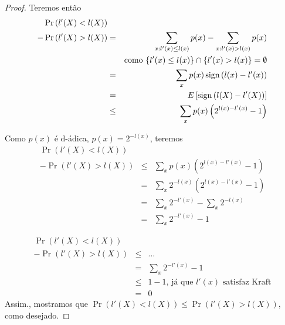 \begin{frame}[allowframebreaks]
\begin{proof}
   \proofbreak

   Teremos então
   \vspace{-0.35cm}
   \begin{eqnarray}
   \Pr \left( l'(X) < l(X) \right) && \nonumber \\
   - \Pr \left( l'(X) > l(X) \right) &=& \sum_{x:l'(x) \leq l(x)} p(x) - \sum_{x:l'(x)>l(x)} p(x) \nonumber \\
		&& \text{como $\{l'(x) \leq l(x)\} \cap \{l'(x)>l(x)\} = \emptyset$} \nonumber \\
		&=& \sum_x p(x) \operatorname{sign}\left( l(x)-l'(x) \right) \nonumber \\
		&=& E \left[ \operatorname{sign} \left( l(X) - l'(X) \right) \right] \nonumber \\
		&\leq& \sum_x p(x) \left( 2^{l(x) - l'(x)} - 1\right)
   \end{eqnarray}

   \proofbreak
 
   Como $p(x)$ é d-ádica, $p(x)=2^{-l(x)}$, teremos
   \begin{eqnarray}
   \Pr \left( l'(X) < l(X) \right) && \nonumber \\
   - \Pr \left( l'(X) > l(X) \right) &\leq& \sum_x p(x) \left( 2^{l(x) - l'(x)} - 1\right) \nonumber \\
		&=& \sum_x 2^{-l(x)} \left( 2^{l(x)-l'(x)} - 1 \right) \nonumber \\
		&=& \sum_x 2^{-l'(x)} - \sum_x 2^{-l(x)} \nonumber \\
		&=& \sum_x 2^{-l'(x)} - 1 
  \end{eqnarray}

  \proofbreak

   \begin{eqnarray}
   \Pr \left( l'(X) < l(X) \right) && \nonumber \\
   - \Pr \left( l'(X) > l(X) \right) &\leq& \ldots \nonumber \\
		&=& \sum_x 2^{-l'(x)} - 1 \nonumber \\
		&\leq& 1 - 1 \text{, \ já que $l'(x)$ satisfaz Kraft} \nonumber \\
		&=& 0
   \end{eqnarray}
   Assim., mostramos que $\Pr \left( l'(X) < l(X) \right) \leq \Pr \left( l'(X) > l(X) \right)$, como desejado.

   \end{proof}
\end{frame}

